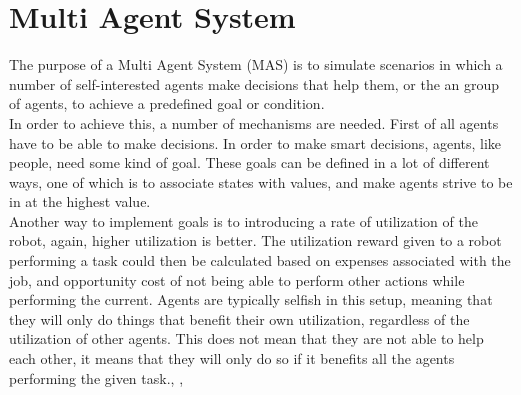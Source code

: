 \chapter{Multi Agent System}
The purpose of a Multi Agent System (MAS) is to simulate scenarios in which a number of self-interested agents make decisions that help them, or the an group of agents, to achieve a predefined goal or condition.\\

\indent In order to achieve this, a number of mechanisms are needed. First of all agents have to be able to make decisions. In order to make smart decisions, agents, like people, need some kind of goal. These goals can be defined in a lot of different ways, one of which is to associate states with values, and make agents strive to be in at the highest value.\cite{MAS} \\ 



\indent Another way to implement goals is to introducing a rate of utilization of the robot, again, higher utilization is better. The utilization reward given to a robot performing a task could then be calculated based on expenses associated with the job, and opportunity cost of not being able to perform other actions while performing the current. Agents are typically selfish in this setup, meaning that they will only do things that benefit their own utilization, regardless of the utilization of other agents. This does not mean that they are not able to help each other, it means that they will only do so if it benefits all the agents performing the given task.\cite{MAS}, \cite{MAP}, \cite{fundamentalsofMAS}


